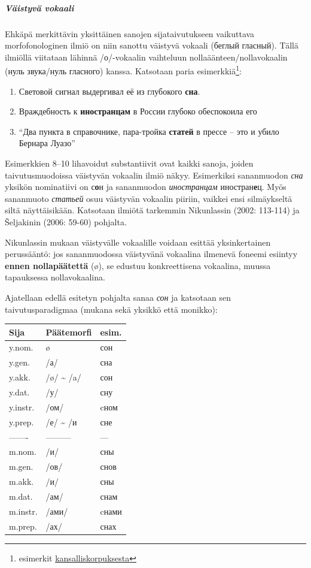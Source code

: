 \documentclass[]{scrreprt}
\providecommand{\tightlist}{%
  \setlength{\itemsep}{0pt}\setlength{\parskip}{0pt}}
\begin{document}
\subparagraph{Väistyvä vokaali}\label{vuxe4istyvuxe4-vokaali}

Ehkäpä merkittävin yksittäinen sanojen sijataivutukseen vaikuttava
morfofonologinen ilmiö on niin sanottu väistyvä vokaali (беглый
гласный). Tällä ilmiöllä viitataan lähinnä /о/-vokaalin
vaihteluun nollaäänteen/nollavokaalin (нуль звука/нуль гласного) kanssa.
Katsotaan paria esimerkkiä\footnote{esimerkit
  \href{http://ruscorpora.ru}{kansalliskorpuksesta}}:

\begin{enumerate}
\def\labelenumi{(\arabic{enumi})}
\setcounter{enumi}{7}
\tightlist
\item
  Световой сигнал выдергивал её из глубокого \textbf{сна}.
\item
  Враждебность к \textbf{иностранцам} в России глубоко обеспокоила его
\item
  ``Два пункта в справочнике, пара-тройка \textbf{статей} в прессе --
  это и убило Бернара Луазо''
\end{enumerate}

Esimerkkien 8--10 lihavoidut substantiivit ovat kaikki sanoja, joiden
taivutusmuodoissa väistyvän vokaalin ilmiö näkyy. Esimerkiksi
sananmuodon \emph{сна} yksikön nominatiivi on с\textbf{о}н ja
sananmuodon \emph{иностранцам} иностран\textbf{е}ц. Myös sananmuoto
\emph{статьей} osuu väistyvän vokaalin piiriin, vaikkei ensi
silmäykseltä siltä näyttäisikään. Katsotaan ilmiötä tarkemmin
Nikunlassin (2002: 113-114) ja Šeljakinin (2006: 59-60) pohjalta.

Nikunlassin mukaan väistyvälle vokaalille voidaan esittää yksinkertainen
perussääntö: jos sananmuodossa väistyvänä vokaalina ilmenevä foneemi
esiintyy \textbf{ennen nollapäätettä} (ø), se edustuu konkreettisena
vokaalina, muussa tapauksessa nollavokaalina.

Ajatellaan edellä esitetyn pohjalta sanaa \emph{сон} ja katsotaan sen
taivutusparadigmaa (mukana sekä yksikkö että monikko):

\begin{longtable}[c]{@{}lll@{}}
\toprule
Sija & Päätemorfi & esim.\tabularnewline
\midrule
\endhead
y.nom. & ø & сон\tabularnewline
y.gen. & /а/ & сна\tabularnewline
y.akk. & /ø/ \textasciitilde{} /a/ & сон\tabularnewline
y.dat. & /у/ & сну\tabularnewline
y.instr. & /ом/ & cном\tabularnewline
y.prep. & /е/ \textasciitilde{} /и & сне\tabularnewline
------- & --------- & ---\tabularnewline
m.nom. & /и/ & сны\tabularnewline
m.gen. & /ов/ & снов\tabularnewline
m.akk. & /и/ & сны\tabularnewline
m.dat. & /ам/ & снам\tabularnewline
m.instr. & /ами/ & cнами\tabularnewline
m.prep. & /ах/ & снах\tabularnewline
\bottomrule
\end{longtable}
\end{document}
